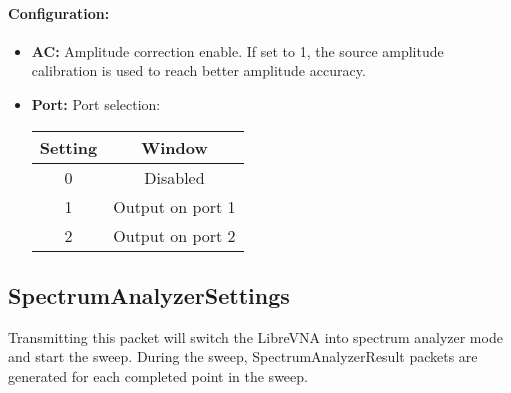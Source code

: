 \documentclass[a4paper,11pt]{article}
\newcommand{\bitrect}[2]{
  \begin{pgfonlayer}{foreground}
    \draw [thick] (0,0) rectangle (#1,1);
    \pgfmathsetmacro\result{#1-1}
    \foreach \x in {1,...,\result}
      \draw [thick] (\x,1) -- (\x, 0.8);
  \end{pgfonlayer}
  \bitlabels{#1}{#2}
}
\newcommand{\rwbits}[3]{
  \draw [thick] (#1,0) rectangle ++(#2,1) node[pos=0.5]{#3};
  \pgfmathsetmacro\start{#1+0.5}
  \pgfmathsetmacro\finish{#1+#2-0.5}
}
\newcommand{\robits}[3]{
  \begin{pgfonlayer}{background}
    \draw [thick, fill=lightgray] (#1,0) rectangle ++(#2,1) node[pos=0.5]{#3};
  \end{pgfonlayer}
  \pgfmathsetmacro\start{#1+0.5}
  \pgfmathsetmacro\finish{#1+#2-0.5}
}
\newcommand{\bitlabels}[2]{
  \foreach \bit in {1,...,#1}{
     \pgfmathsetmacro\result{#2}
     \node [above] at (\bit-0.5, 1) {\pgfmathprintnumber{\result}};
   }
}
\begin{document}
\paragraph{Configuration:}
\begin{center}
\end{center}

\begin{itemize}
\item \textbf{AC:} Amplitude correction enable. If set to 1, the source amplitude calibration is used to reach better amplitude accuracy.
\item \textbf{Port:} Port selection:
\begin{center}
\begin{tabular}{ c|c }
Setting & Window\\
 \hline
0 & Disabled \\
1 & Output on port 1\\
2 & Output on port 2\\
\end{tabular}
\end{center}
\end{itemize}

\subsection{SpectrumAnalyzerSettings}
Transmitting this packet will switch the LibreVNA into spectrum analyzer mode and start the sweep. During the sweep, SpectrumAnalyzerResult packets are generated for each completed point in the sweep.
\end{document}
